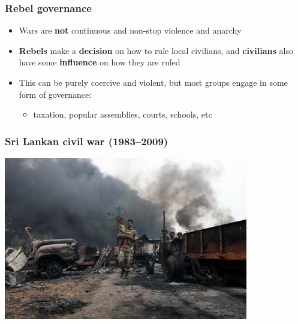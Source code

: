 \documentclass[aspectratio=43]{beamer}
\begin{document}
\begin{frame}
\frametitle{Rebel governance}
\centering

\begin{itemize}
  \item<1-> Wars are \textbf{not} continuous and non-stop violence and anarchy
  \item<2-> \textbf{Rebels} make a \textbf{decision} on how to rule local civilians, and \textbf{civilians} also have some \textbf{influence} on how they are ruled
  \item<3-> This  can be purely coercive and violent, but most groups engage in some form of governance:
  \begin{itemize}
    \item taxation, popular assemblies, courts, schools, etc
  \end{itemize}
\end{itemize}

\end{frame}

\begin{frame}
\frametitle{Sri Lankan civil war (1983--2009)}
\centering

\includegraphics[width = 0.8\textwidth]{img/sri_lanka_war}

\end{frame}
\end{document}
